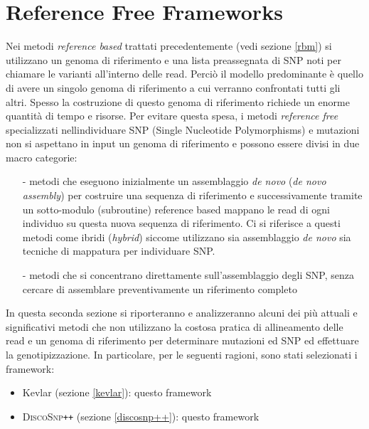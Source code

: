 \documentclass[../main.tex]{subfiles}
\begin{document}
\section{Reference Free Frameworks}
\label{rfm}

Nei metodi \textit{reference based} trattati precedentemente (vedi sezione \ref{rbm}) si utilizzano un genoma di riferimento e una lista preassegnata di SNP noti per chiamare le varianti all'interno delle read. Perci\`o il modello predominante \`e quello di avere un singolo genoma di riferimento a cui verranno confrontati tutti gli altri. Spesso la costruzione di questo genoma di riferimento richiede un enorme quantit\`a di tempo e risorse. Per evitare questa spesa, i metodi \textit{reference free} specializzati nell\textquotesingle individuare SNP (Single Nucleotide Polymorphisms) e mutazioni non si aspettano in input un genoma di riferimento e possono essere divisi in due macro categorie:

\begin{itemize} 
\item[-] metodi che eseguono inizialmente un assemblaggio \textit{de novo} (\textit{de novo assembly}) per costruire una sequenza di riferimento e successivamente tramite un sotto-modulo (subroutine) reference based mappano le read di ogni individuo su questa nuova sequenza di riferimento. Ci si riferisce a questi metodi come ibridi (\textit{hybrid}) siccome utilizzano sia assemblaggio \textit{de novo} sia tecniche di mappatura per individuare SNP.
\item[-] metodi che si concentrano direttamente sull’assemblaggio degli SNP, senza cercare di assemblare preventivamente un riferimento completo
\end{itemize}

In questa seconda sezione si riporteranno e analizzeranno alcuni dei pi\`u attuali e significativi metodi che non utilizzano la costosa pratica di allineamento delle read e un genoma di riferimento per determinare mutazioni ed SNP ed effettuare la genotipizzazione. In particolare, per le seguenti ragioni, sono stati selezionati i framework:
\begin{itemize} 
\item Kevlar (sezione \ref{kevlar}): questo framework \cite{}
\item \textsc{DiscoSnp}\texttt{++} (sezione \ref{discosnp++}): questo framework \cite{} 
\end{itemize}
\end{document}
